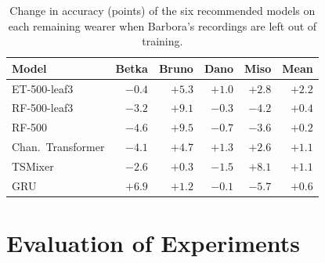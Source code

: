 \documentclass[conference]{IEEEtran}
\begin{document}
\begin{table}[!htb]
  \caption{Change in accuracy (points) of the six recommended models on each
  remaining wearer when Barbora's recordings are left out of training.}
  \label{tab:barbora-models}
  \centering
  \footnotesize
  \setlength{\tabcolsep}{3.5pt}
  \begin{tabular}{lrrrrr}
    \hline
    Model & Betka & Bruno & Dano & Miso & Mean \\
    \hline
    ET-500-leaf3       & $-0.4$ & $+5.3$ & $+1.0$ & $+2.8$ & $+2.2$ \\
    RF-500-leaf3       & $-3.2$ & $+9.1$ & $-0.3$ & $-4.2$ & $+0.4$ \\
    RF-500             & $-4.6$ & $+9.5$ & $-0.7$ & $-3.6$ & $+0.2$ \\
    \hline
    Chan.\ Transformer & $-4.1$ & $+4.7$ & $+1.3$ & $+2.6$ & $+1.1$ \\
    TSMixer            & $-2.6$ & $+0.3$ & $-1.5$ & $+8.1$ & $+1.1$ \\
    GRU                & $+6.9$ & $+1.2$ & $-0.1$ & $-5.7$ & $+0.6$ \\
    \hline
  \end{tabular}
\end{table}

\section{Evaluation of Experiments}
\label{sec:evaluation}
\end{document}
